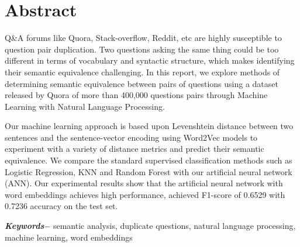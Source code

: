 \chapter*{Abstract} %
Q\&A forums like Quora, Stack-overflow, Reddit, etc are highly susceptible to question pair duplication. Two questions asking the same thing could be too different in terms of vocabulary and syntactic structure, which makes identifying their semantic equivalence challenging. In this report, we explore methods of determining semantic equivalence between pairs of questions using a dataset released by Quora of more than 400,000 questions pairs through Machine Learning with Natural Language Processing. 

Our machine learning approach is based upon Levenshtein distance between two sentences and the sentence-vector encoding using Word2Vec models to experiment with a variety of distance metrics and predict their semantic equivalence. We compare the standard supervised classification methods such as Logistic Regression, KNN and Random Forest with our artificial neural network (ANN). Our experimental results show that the artificial neural network with word embeddings achieves high performance, achieved F1-score of 0.6529 with 0.7236 accuracy on the test set.
\par
\textbf{\textit{Keywords$-$}} semantic analysis, duplicate questions, natural language processing, machine learning, word embeddings


{
\KECadjusttocspacings %
\makeatletter
\def\@makeschapterhead#1{%
  {\newpage \parindent \z@ \raggedright
    \normalfont
    \interlinepenalty\@M
    \center \fontsize{16pt}{1} \bfseries \MakeUppercase{#1}\par\nobreak
    \vskip 18\p@ %
  }}
\makeatother 
\tableofcontents %
\listoffigures %

\listoftables %
}

